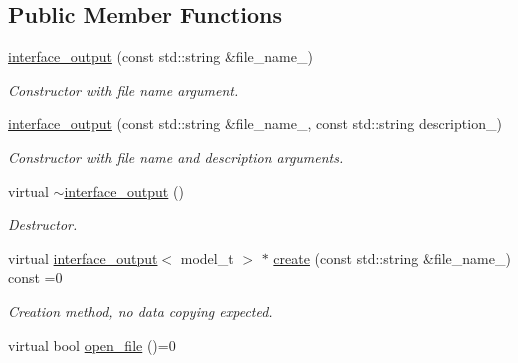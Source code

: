 \subsection*{Public Member Functions}
\begin{DoxyCompactItemize}
\item 
\hypertarget{a00319_aa5ce96d626aa9caeeba50ea9e44461cb}{}\hyperlink{a00319_aa5ce96d626aa9caeeba50ea9e44461cb}{interface\+\_\+output} (const std\+::string \&file\+\_\+name\+\_\+)\label{a00319_aa5ce96d626aa9caeeba50ea9e44461cb}

\begin{DoxyCompactList}\small\item\em Constructor with file name argument. \end{DoxyCompactList}\item 
\hypertarget{a00319_a760fd43bcc09c6ad679ad7a02dfc0b41}{}\hyperlink{a00319_a760fd43bcc09c6ad679ad7a02dfc0b41}{interface\+\_\+output} (const std\+::string \&file\+\_\+name\+\_\+, const std\+::string description\+\_\+)\label{a00319_a760fd43bcc09c6ad679ad7a02dfc0b41}

\begin{DoxyCompactList}\small\item\em Constructor with file name and description arguments. \end{DoxyCompactList}\item 
\hypertarget{a00319_a2c347bdc9f312885ec2b2a6c106d6b08}{}virtual \hyperlink{a00319_a2c347bdc9f312885ec2b2a6c106d6b08}{$\sim$interface\+\_\+output} ()\label{a00319_a2c347bdc9f312885ec2b2a6c106d6b08}

\begin{DoxyCompactList}\small\item\em Destructor. \end{DoxyCompactList}\item 
\hypertarget{a00319_a82146fc6a440711b242c5fd2f4909f2b}{}virtual \hyperlink{a00319}{interface\+\_\+output}$<$ model\+\_\+t $>$ $\ast$ \hyperlink{a00319_a82146fc6a440711b242c5fd2f4909f2b}{create} (const std\+::string \&file\+\_\+name\+\_\+) const =0\label{a00319_a82146fc6a440711b242c5fd2f4909f2b}

\begin{DoxyCompactList}\small\item\em Creation method, no data copying expected. \end{DoxyCompactList}\item 
\hypertarget{a00319_ab056e5f5f2fe27c097d06e5d25f6e22c}{}virtual bool \hyperlink{a00319_ab056e5f5f2fe27c097d06e5d25f6e22c}{open\+\_\+file} ()=0\label{a00319_ab056e5f5f2fe27c097d06e5d25f6e22c}


\end{DoxyCompactItemize}
